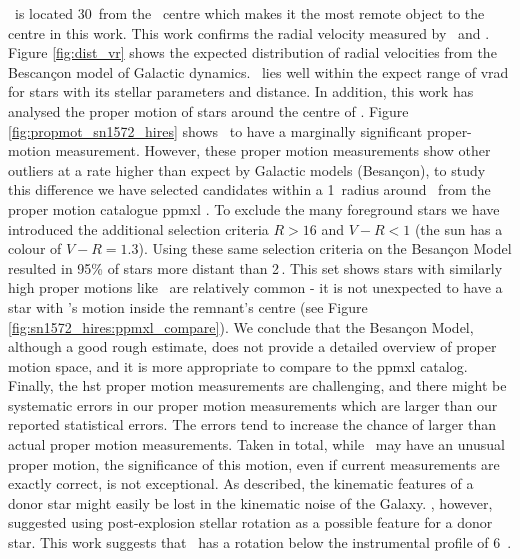\starg\ is located 30\arcsec\ from the \xray\ centre which makes it the most remote object to the centre in this work. This work confirms the radial velocity measured by \gh\ and \wek. Figure \ref{fig:dist_vr} shows the expected distribution of radial velocities from the Bescan\c{c}on model of Galactic dynamics. \starg\ lies well within the expect range of \gls{vrad} for stars with its stellar parameters and distance. 
In addition, this work has analysed the proper motion of stars around the centre of . Figure \ref{fig:propmot_sn1572_hires} shows \starg\ to have a marginally significant proper-motion measurement. However, these proper motion measurements show other outliers at a rate higher than expect by Galactic models (Besan\c{c}on), to study this difference we have selected candidates within a 1\degree\ radius around \ from the proper motion catalogue \gls{ppmxl} \citep{2010AJ....139.2440R}.  To exclude the many foreground stars we have introduced the additional selection criteria $R>16$ and $V-R < 1$ (the sun has a colour of $V-R=1.3$). Using these same selection criteria on the Besan\c{c}on Model resulted in 95\% of stars more distant than 2\,\kpc. This set shows stars with similarly high proper motions like \starg\ are relatively common - it is not unexpected to have a star with \starg's motion inside the remnant's centre (see Figure \ref{fig:sn1572_hires:ppmxl_compare}). We conclude that the Besan\c{c}on Model, although a good rough estimate, does not provide a detailed overview of proper motion space, and it is more appropriate to compare to the \gls{ppmxl} catalog. Finally, the \gls{hst} proper motion measurements are challenging, and there might be systematic errors in our proper motion measurements which are larger than our reported statistical errors. The errors tend to increase the chance of larger than actual proper motion measurements. Taken in total, while \starg\ may have an unusual proper motion, the significance of this motion, even if current measurements are exactly correct, is not exceptional.
As described, the kinematic features of a donor star might easily be lost in the kinematic noise of the Galaxy. \wek, however, suggested using post-explosion stellar rotation as a possible feature for a donor star. This work suggests that \starg\ has a rotation below the instrumental profile  of 6~\kms. 

